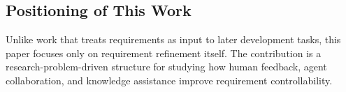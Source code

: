 \subsection{Positioning of This Work}
\label{subsec:rw-positioning}
Unlike work that treats requirements as input to later development tasks, this paper focuses only on requirement refinement itself. The contribution is a research-problem-driven structure for studying how human feedback, agent collaboration, and knowledge assistance improve requirement controllability.
